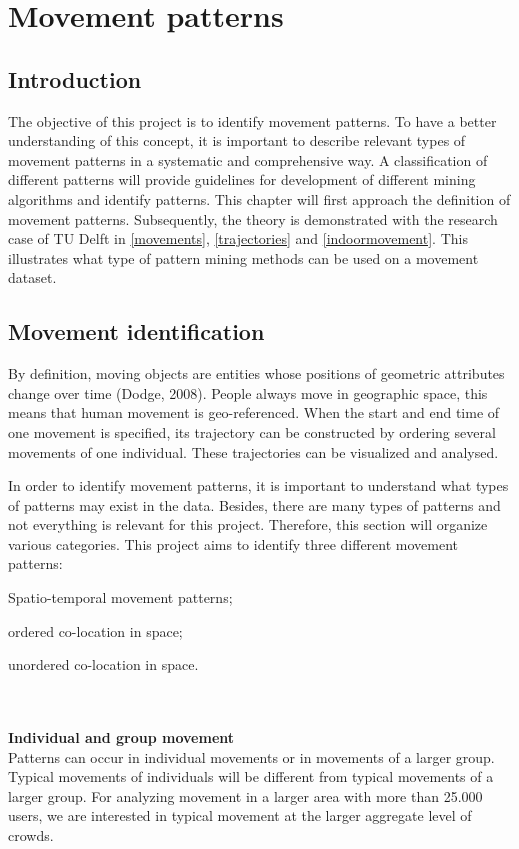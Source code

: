 \chapter{Movement patterns}\label{movementpatterns}

\section{Introduction}
The objective of this project is to identify movement patterns. To have a better understanding of this concept, it is important to describe relevant types of movement patterns in a systematic and comprehensive way. A classification of different patterns will provide guidelines for development of different mining algorithms and identify patterns. This chapter will first approach the definition of movement patterns. Subsequently, the theory is demonstrated with the research case of TU Delft in \autoref{movements}, \autoref{trajectories} and \autoref{indoormovement}. This illustrates what type of pattern mining methods can be used on a movement dataset. 

\section{Movement identification}
By definition, moving objects are entities whose positions of geometric attributes change over time (Dodge, 2008). People always move in geographic space, this means that human movement is geo-referenced. When the start and end time of one movement is specified, its trajectory can be constructed by ordering several movements of one individual. These trajectories can be visualized and analysed.

In order to identify movement patterns, it is important to understand what types of patterns may exist in the data. Besides, there are many types of patterns and not everything is relevant for this project. Therefore, this section will organize various categories. This project aims to identify three different movement patterns: \begin {enumerate*} [label=\itshape\arabic*\upshape),font={\color{red!0!black}\bfseries}] \item Spatio-temporal movement patterns; \item ordered co-location in space; \item unordered co-location in space. \end {enumerate*}\\\\
\textbf{Individual and group movement}\\
Patterns can occur in individual movements or in movements of a larger group. Typical movements of individuals will be different from typical movements of a larger group. For analyzing movement in a larger area with more than 25.000 users, we are interested in typical movement at the larger aggregate level of crowds. 


